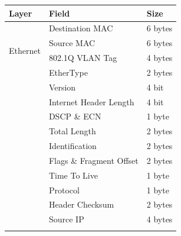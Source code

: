 \documentclass{article}
\begin{document}
\begin{multicols}{2}
  {
  \vspace{1em}
  \centering\small
  \begin{tabular}{|l|l|l|}
    \hline
    \textbf{Layer}                & \textbf{Field}                             & \textbf{Size}               \\\hline
    \multirow{4}{4em}{Ethernet}
                                  & Destination MAC                            & 6 bytes                     \\\hhline{|~|-|-|}
                                  & Source MAC                                 & 6 bytes                     \\\hhline{|~|-|-|}
                                  & \cellcolor{gray!20}802.1Q VLAN Tag         & \cellcolor{gray!20}4 bytes  \\\hhline{|~|-|-|}
                                  & EtherType                                  & 2 bytes                     \\\hhline{|-|-|-|}
    \multirow{12}{4em}{IPv4}      & Version                                    & 4 bit                       \\\hhline{|~|-|-|}
                                  & \cellcolor{green!10}Internet Header Length & \cellcolor{green!10}4 bit   \\\hhline{|~|-|-|}
                                  & DSCP \& ECN                                & 1 byte                      \\\hhline{|~|-|-|}
                                  & \cellcolor{green!10}Total Length           & \cellcolor{green!10}2 bytes \\\hhline{|~|-|-|}
                                  & Identification                             & 2 bytes                     \\\hhline{|~|-|-|}
                                  & Flags \& Fragment Offset                   & 2 bytes                     \\\hhline{|~|-|-|}
                                  & Time To Live                               & 1 byte                      \\\hhline{|~|-|-|}
                                  & Protocol                                   & 1 byte                      \\\hhline{|~|-|-|}
                                  & \cellcolor{blue!10}Header Checksum         & \cellcolor{blue!10}2 bytes  \\\hhline{|~|-|-|}
                                  & Source IP                                  & 4 bytes                     \\\hhline{|~|-|-|}

\end{tabular}}
\end{multicols}
\end{document}
